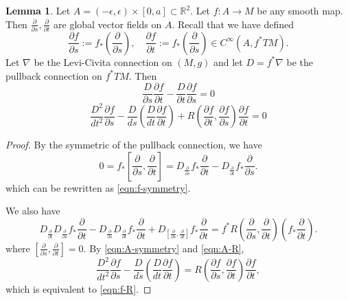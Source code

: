 \documentclass{amsart}
\numberwithin{equation}{section}
\theoremstyle{definition}
\theoremstyle{theorem}
\newtheorem{lemma}[definition]{Lemma}
\begin{document}
\begin{lemma}
Let $A = (-\epsilon, \epsilon) \times [0,a] \subset \mathbb{R}^2$. Let $f : A \to M$ be any smooth map. 
Then $\frac{\partial}{\partial s}, \frac{\partial}{\partial t}$ are global vector fields on $A$. Recall that we have defined
$$
\frac{\partial f}{\partial s} := f_*(\frac{\partial}{\partial s}),\quad
\frac{\partial f}{\partial t} := f_*(\frac{\partial}{\partial s})\in C^\infty(A, f^*TM).
$$
Let $\nabla$ be the Levi-Civita connection on $(M,g)$ and let $D = f^*\nabla$ be the pullback connection on 
$f^*TM$. Then 
\begin{equation}\label{eqn:f-symmetry}
\frac{D}{\partial s}\frac{\partial f}{\partial t}- \frac{D}{\partial t}\frac{\partial f}{\partial s} =0 
\end{equation}
\begin{equation}\label{eqn:f-R}
\frac{D^2}{dt^2} \frac{\partial f}{\partial s} - \frac{D}{ds} \left( \frac{D}{dt} \frac{\partial f}{\partial t}\right) + R(\frac{\partial f}{\partial t}, \frac{\partial f}{\partial s}) \frac{\partial f}{\partial t} = 0 
\end{equation}
\end{lemma}
\begin{proof}
By the symmetric of the pullback connection, we have 
\begin{equation}\label{eqn:A-symmetry}
0 = f_*[\frac{\partial}{\partial s}, \frac{\partial}{\partial t}] = D_{\frac{\partial}{\partial s}}f_*\frac{\partial}{\partial t} - D_{\frac{\partial}{\partial t}} f_*\frac{\partial}{\partial s}.
\end{equation}
which can be rewritten as \eqref{eqn:f-symmetry}.

We also have 
\begin{equation}\label{eqn:A-R}
D_{\frac{\partial}{\partial t}} D_{\frac{\partial}{\partial s}} f_* \frac{\partial}{\partial t} 
- D_{\frac{\partial}{\partial s}} D_{\frac{\partial}{\partial t}} f_* \frac{\partial}{\partial t} 
+ D_{[\frac{\partial}{\partial s},\frac{\partial}{\partial t}]} f_* \frac{\partial}{\partial t} = f^*R(\frac{\partial}{\partial s},\frac{\partial}{\partial t}) (f_*\frac{\partial}{\partial t}).
\end{equation}
where $[\frac{\partial}{\partial s}, \frac{\partial}{\partial t}]=0$. By \eqref{eqn:A-symmetry} and \eqref{eqn:A-R},
$$
\frac{D^2}{dt^2} \frac{\partial f}{\partial s} - \frac{D}{ds} \left( \frac{D}{dt} \frac{\partial f}{\partial t}\right) = R(\frac{\partial f}{\partial s}, \frac{\partial f}{\partial t}) \frac{\partial f}{\partial t},
$$
which is equivalent to \eqref{eqn:f-R}. 
\end{proof}
\end{document}

